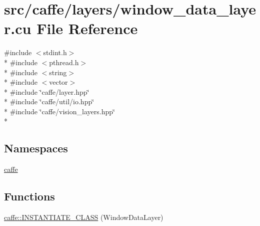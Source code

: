 \hypertarget{window__data__layer_8cu}{\section{src/caffe/layers/window\+\_\+data\+\_\+layer.cu File Reference}
\label{window__data__layer_8cu}
}
{\ttfamily \#include $<$stdint.\+h$>$}\\*
{\ttfamily \#include $<$pthread.\+h$>$}\\*
{\ttfamily \#include $<$string$>$}\\*
{\ttfamily \#include $<$vector$>$}\\*
{\ttfamily \#include \char`\"{}caffe/layer.\+hpp\char`\"{}}\\*
{\ttfamily \#include \char`\"{}caffe/util/io.\+hpp\char`\"{}}\\*
{\ttfamily \#include \char`\"{}caffe/vision\+\_\+layers.\+hpp\char`\"{}}\\*
\subsection*{Namespaces}
\begin{DoxyCompactItemize}
\item 
 \hyperlink{namespacecaffe}{caffe}
\end{DoxyCompactItemize}
\subsection*{Functions}
\begin{DoxyCompactItemize}
\item 
\hyperlink{namespacecaffe_a2f03ba694679a26b9e565f9ca2bc02ca}{caffe\+::\+I\+N\+S\+T\+A\+N\+T\+I\+A\+T\+E\+\_\+\+C\+L\+A\+S\+S} (Window\+Data\+Layer)
\end{DoxyCompactItemize}
